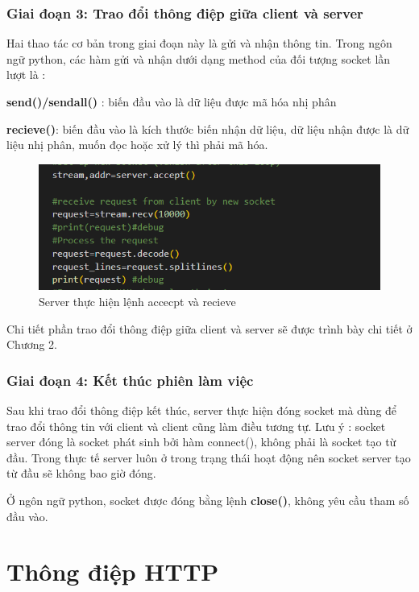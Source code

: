 \documentclass[14pt]{extreport}
\begin{document}
\subsection{Giai đoạn 3: Trao đổi thông điệp giữa client và server}
Hai thao tác cơ bản trong giai đoạn này là gửi và nhận thông tin. Trong ngôn ngữ python, các hàm gửi và nhận dưới dạng method của đối tượng socket lần lượt là : 

{\bf send()/sendall()} : biến đầu vào là dữ liệu được mã hóa nhị phân

{\bf recieve()}: biến đầu vào là kích thước biến nhận dữ liệu, dữ liệu nhận được là dữ liệu nhị phân, muốn đọc hoặc xử lý thì phải mã hóa.

\begin{center}
    \begin{figure}[H]
    \begin{center}
     \includegraphics[scale=.8]{server accept va recieve.PNG}
    \end{center}
    \caption{Server thực hiện lệnh accecpt và recieve}
    \end{figure}
\end{center}

Chi tiết phần trao đổi thông điệp giữa client và server sẽ được trình bày chi tiết ở Chương 2.

\subsection{Giai đoạn 4: Kết thúc phiên làm việc}
Sau khi trao đổi thông điệp kết thúc, server thực hiện đóng socket mà dùng để trao đổi thông tin với client và client cũng làm điều tương tự. Lưu ý : socket server đóng là socket phát sinh bởi hàm connect(), không phải là socket tạo từ đầu. Trong thực tế server luôn ở trong trạng thái hoạt động nên socket server tạo từ đầu sẽ không bao giờ đóng.

Ở ngôn ngữ python, socket được đóng bằng lệnh {\bf close()}, không yêu cầu tham số đầu vào.

\chapter{Thông điệp HTTP}
\end{document}
